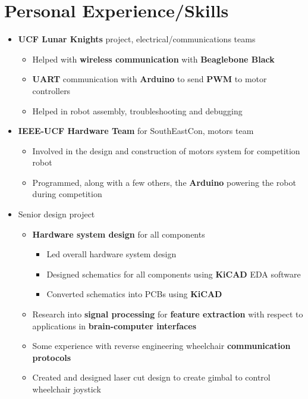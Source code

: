 \documentclass{my_resume}
\begin{document}
\section{Personal Experience/Skills}
\begin{itemize}
    \item \textbf{UCF Lunar Knights} project, electrical/communications teams
        \begin{itemize}
            \item Helped with \textbf{wireless communication} with
                \textbf{Beaglebone Black}
            \item \textbf{UART} communication with \textbf{Arduino} to send
                \textbf{PWM} to motor controllers
            \item Helped in robot assembly, troubleshooting and debugging
        \end{itemize}
    \item \textbf{IEEE-UCF Hardware Team} for SouthEastCon, motors team
        \begin{itemize}
            \item Involved in the design and construction of motors system for
                competition robot
            \item Programmed, along with a few others, the \textbf{Arduino}
                powering the robot during competition
        \end{itemize}
    \item Senior design project
        \begin{itemize}
            \item \textbf{Hardware system design} for all components
            \begin{itemize}
                \item Led overall hardware system design
                \item Designed schematics for all components using \textbf{KiCAD} EDA software
                \item Converted schematics into PCBs using \textbf{KiCAD}
            \end{itemize}
            \item Research into \textbf{signal processing} for \textbf{feature extraction}
                with respect to applications in \textbf{brain-computer interfaces}
            \item Some experience with reverse engineering wheelchair 
                \textbf{communication protocols}
            \item Created and designed laser cut design to create gimbal to control wheelchair joystick

\end{itemize}
\end{itemize}
\end{document}
